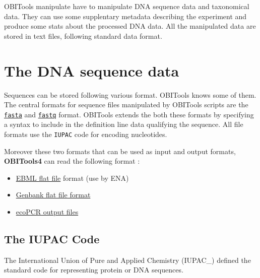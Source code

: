 \documentclass[
  letterpaper,
  DIV=11,
  numbers=noendperiod]{scrreprt}
\providecommand{\tightlist}{%
  \setlength{\itemsep}{0pt}\setlength{\parskip}{0pt}}\usepackage{longtable,booktabs,array}
\begin{document}
OBITools manipulate have to manipulate DNA sequence data and taxonomical
data. They can use some supplentary metadata describing the experiment
and produce some stats about the processed DNA data. All the manipulated
data are stored in text files, following standard data format.

\hypertarget{the-dna-sequence-data}{%
\chapter{The DNA sequence data}\label{the-dna-sequence-data}}

Sequences can be stored following various format. OBITools knows some of
them. The central formats for sequence files manipulated by OBITools
scripts are the
\protect\hyperlink{the-fasta-sequence-format}{\texttt{fasta}} and
\protect\hyperlink{the-fastq-sequence-format}{\texttt{fastq}} format.
OBITools extends the both these formats by specifying a syntax to
include in the definition line data qualifying the sequence. All file
formats use the \texttt{IUPAC} code for encoding nucleotides.

Moreover these two formats that can be used as input and output formats,
\textbf{OBITools4} can read the following format :

\begin{itemize}
\tightlist
\item
  \href{https://ena-docs.readthedocs.io/en/latest/submit/fileprep/flat-file-example.html}{EBML
  flat file} format (use by ENA)
\item
  \href{https://www.ncbi.nlm.nih.gov/Sitemap/samplerecord.html}{Genbank
  flat file format}
\item
  \href{https://pythonhosted.org/OBITools/scripts/ecoPCR.html}{ecoPCR
  output files}
\end{itemize}

\hypertarget{the-iupac-code}{%
\section{The IUPAC Code}\label{the-iupac-code}}

The International Union of Pure and Applied Chemistry (IUPAC\_) defined
the standard code for representing protein or DNA sequences.
\end{document}

